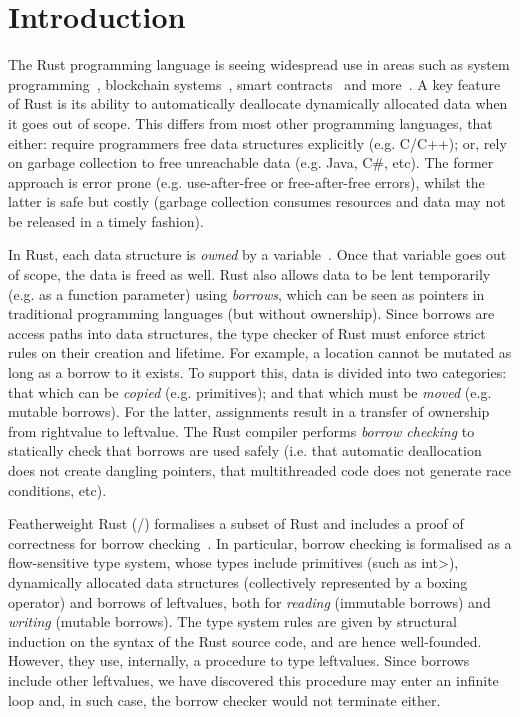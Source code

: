 \section{Introduction}\label{sec:introduction}

The Rust programming language is seeing widespread use in areas such
as system programming~\cite{ABGMMMS16,BBBPRR17,LCGPDL17}, blockchain
systems~\cite{HHHH18,NQ20}, smart contracts~\cite{Ash20,ZHCKHJJMS20}
and more~\cite{BHR18,AMPS19}.  A key feature of Rust is its ability to
automatically deallocate dynamically allocated data when it goes out
of scope. This differs from most other programming languages, that
either: require programmers free data structures explicitly
(e.g. C/C++); or, rely on garbage collection to free unreachable data
(e.g. Java, C\#, etc).  The former approach is error prone
(e.g. use-after-free or free-after-free errors), whilst the latter is
safe but costly (garbage collection consumes resources and data may
not be released in a timely fashion).

In Rust, each data structure is \emph{owned} by a
variable~\cite{RustBook}. Once that variable goes out of scope, the
data is freed as well.  Rust also allows data to be lent temporarily
(e.g. as a function parameter) using {\em borrows}, which can be seen
as pointers in traditional programming languages (but without
ownership).  Since borrows are access paths into data structures, the
type checker of Rust must enforce strict rules on their creation and
lifetime.  For example, a location cannot be mutated as long as a
borrow to it exists.  To support this, data is divided into two
categories: that which can be {\em copied} (e.g. primitives); and that
which must be {\em moved} (e.g. mutable borrows).  For the latter,
assignments result in a transfer of ownership from rightvalue to
leftvalue.  The Rust compiler performs \emph{borrow checking} to
statically check that borrows are used safely (i.e. that automatic
deallocation does not create dangling pointers, that multithreaded
code does not generate race conditions, etc).

Featherweight Rust (\FR/) formalises a subset of Rust and includes a
proof of correctness for borrow checking~\cite{Pea21}.  In particular,
borrow checking is formalised as a flow-sensitive type system, whose
types include primitives (such as \<int>), dynamically allocated data
structures (collectively represented by a boxing operator) and borrows
of leftvalues, both for {\em reading} (immutable borrows) and {\em
  writing} (mutable borrows). The type system rules are given by
structural induction on the syntax of the Rust source code, and are
hence well-founded. However, they use, internally, a procedure to type
leftvalues. Since borrows include other leftvalues, we have discovered
this procedure may enter an infinite loop and, in such case, the
borrow checker would not terminate either.

